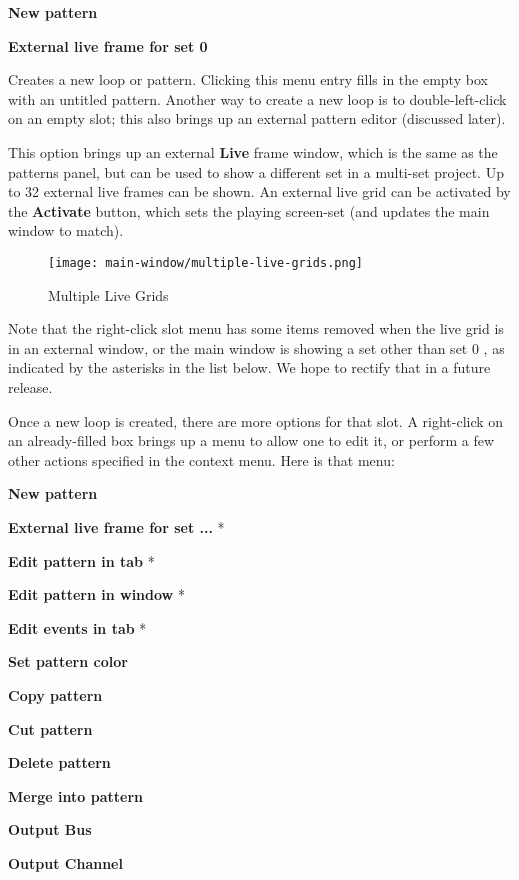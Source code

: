    \begin{enumber}
      \item \textbf{New pattern}
      \item \textbf{External live frame for set 0}
   \end{enumber}

   \setcounter{ItemCounter}{0}      %

   Creates a new loop or pattern.
   Clicking this menu entry fills in the empty box with an untitled
   pattern.  Another way to create a new loop is to double-left-click on an
   empty slot; this also brings up an external pattern editor (discussed
   later).

   This option brings up an external \textbf{Live} frame window, which
   is the same as the patterns panel, but can be used to show a different set
   in a multi-set project.  Up to 32 external live frames can be shown.
   An external live grid can be activated by the \textbf{Activate} button,
   which sets the playing screen-set
   (and updates the main window to match).

\begin{figure}[H]
   \centering 
   \texttt{[image: main-window/multiple-live-grids.png]}
   \caption{Multiple Live Grids}
   \label{fig:multiple_live_grids}
\end{figure}

   Note that the right-click slot menu has some items removed when the live
   grid is in an external window, or the main window is showing a set other
   than set 0 , as indicated by
   the asterisks in the list below.
   We hope to rectify that in a future release.

   Once a new loop is created, there are more options for that slot.
   A right-click on an already-filled box brings up a menu
   to allow one to edit it, or perform a few other actions
   specified in the context menu.  Here is that menu:

   \begin{enumber}
      \item \textbf{New pattern}
      \item \textbf{External live frame for set ...} *
      \item \textbf{Edit pattern in tab} *
      \item \textbf{Edit pattern in window} *
      \item \textbf{Edit events in tab} *
      \item \textbf{Set pattern color}
      \item \textbf{Copy pattern}
      \item \textbf{Cut pattern}
      \item \textbf{Delete pattern}
      \item \textbf{Merge into pattern}
      \item \textbf{Output Bus}
      \item \textbf{Output Channel}
   \end{enumber}

